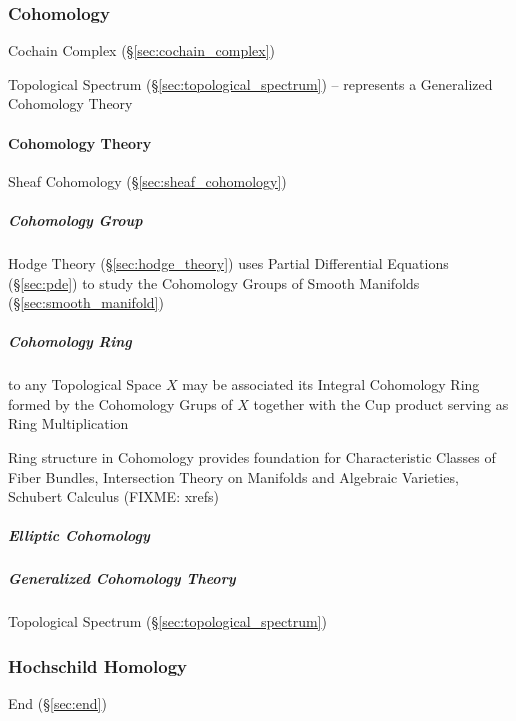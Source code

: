 \subsubsection{Cohomology}\label{sec:cohomology}

Cochain Complex (\S\ref{sec:cochain_complex})

Topological Spectrum (\S\ref{sec:topological_spectrum}) --
represents a Generalized Cohomology Theory



\paragraph{Cohomology Theory}\label{sec:cohomology_theory}\hfill

Sheaf Cohomology (\S\ref{sec:sheaf_cohomology})



\subparagraph{Cohomology Group}\label{sec:cohomology_group}\hfill

\fist Hodge Theory (\S\ref{sec:hodge_theory}) uses Partial Differential
Equations (\S\ref{sec:pde}) to study the Cohomology Groups of Smooth Manifolds
(\S\ref{sec:smooth_manifold})



\subparagraph{Cohomology Ring}\label{sec:cohomology_ring}\hfill

to any Topological Space $X$ may be associated its Integral Cohomology Ring
formed by the Cohomology Grups of $X$ together with the Cup product serving as
Ring Multiplication

Ring structure in Cohomology provides foundation for Characteristic Classes of
Fiber Bundles, Intersection Theory on Manifolds and Algebraic Varieties,
Schubert Calculus (FIXME: xrefs)



\subparagraph{Elliptic Cohomology}\label{sec:elliptic_cohomology}\hfill

\subparagraph{Generalized Cohomology Theory}
\label{sec:generalized_cohomology_theory}\hfill

Topological Spectrum (\S\ref{sec:topological_spectrum})



\subsubsection{Hochschild Homology}\label{sec:hochschild_homology}

End (\S\ref{sec:end})



